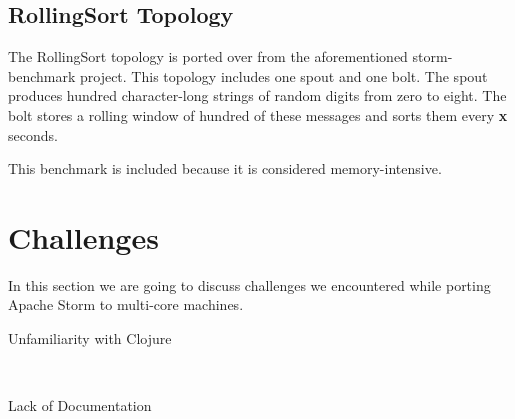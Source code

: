 \subsection{RollingSort Topology}

The RollingSort topology is ported over from the aforementioned storm-benchmark project. This topology includes one spout and one bolt. The spout produces hundred character-long strings of random digits from zero to eight. The bolt stores a rolling window of hundred of these messages and sorts them every \textbf{x} seconds.

This benchmark is included because it is considered memory-intensive.


\section{Challenges}
\label{sec:challenges}

In this section we are going to discuss challenges we encountered while porting Apache Storm to multi-core machines.

\begin{description}
	\item[Unfamiliarity with Clojure] \hfill \\
	
	\item[Lack of Documentation] \hfill \\
	
\end{description}

